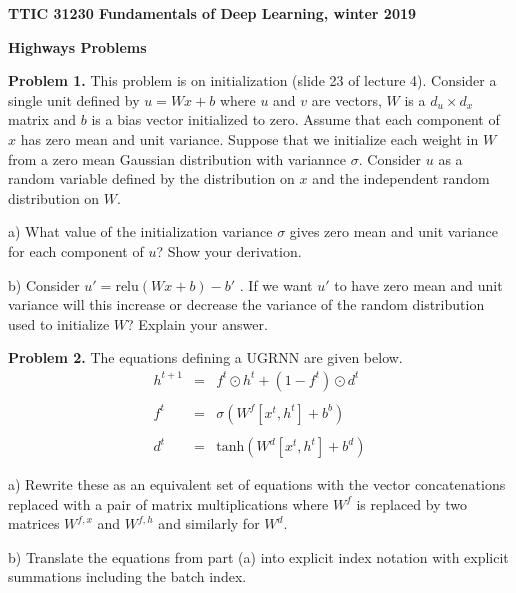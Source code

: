 \documentclass{article}
\newcommand{\solution}[1]{}
\begin{document}
\centerline{\bf TTIC 31230 Fundamentals of Deep Learning, winter 2019}

\bigskip
\centerline{\bf Highways Problems}


{\bf Problem 1.}  This problem is on initialization (slide 23 of lecture 4).  Consider a single unit defined by $u = Wx + b$ where $u$ and $v$ are vectors, $W$ is a $d_u \times d_x$ matrix and $b$ is a bias vector initialized to zero.  Assume that each component of $x$ has zero mean and unit variance.   Suppose that we initialize each weight in $W$ from a zero mean Gaussian distribution with variannce $\sigma$. Consider $u$ as a random variable defined by the distribution on $x$ and the independent random distribution on $W$.

a) What value of the initialization variance
$\sigma$ gives zero mean and unit variance for each component of $u$?  Show your derivation.

b) Consider $u' = \mathrm{relu}(Wx+ b) - b'$ .  If we want $u'$ to have zero mean and unit variance will this increase or decrease the variance of the random distribution used to initialize $W$?  Explain your answer.

\bigskip
{\bf Problem 2.} The equations defining a UGRNN are given below.
\begin{eqnarray*}
h^{t+1} & = & f^t\odot h^t + (1-f^t)\odot d^t \\
\\
f^t & = & \sigma(W^f[x^t,h^t] + b^b) \\
\\
d^t & = & \mathrm{tanh}(W^d[x^t,h^t] + b^d)
\end{eqnarray*}

a) Rewrite these as an equivalent set of equations with the vector concatenations replaced with a pair of matrix multiplications
where $W^f$ is replaced by two matrices $W^{f,x}$ and $W^{f,h}$ and similarly for $W^d$.

\solution{
$$h^{t+1} = f^t\odot h^t + (1-f^t)\odot d^t$$

$$f^t = \sigma(W^{f,x}x^t + W^{f,h}h^t + b^f)$$

$$d^t =  \mathrm{tanh}(W^{d,x}x^t + W^{d,h}h^t + b^d)$$

}

b) Translate the equations from part (a) into explicit index notation with explicit summations including the batch index.

\solution{
\begin{eqnarray*}
h^{t+1}[b,c] & =  & f^t[b,c]h^t[b,c] + (1-f^t[b,c])d^t[b,c] \\
\\
f^t[b,c] & = & \sigma\left(\left(\sum_{c'} W^{f,x}[c,c']x[b,c']\right) + \left(\sum_{c'} W^{f,h}[c,c']h^t[b,c']\right) + b^h[c]\right) \\
\\
d^t[b,c] & = & \sigma\left(\left(\sum_{c'} W^{d,x}[c,c']x[b,c']\right) + \left(\sum_{c'} W^{d,h}[c,c']h^t[b,c']\right) + b^d[c]\right)
\end{eqnarray*}
}
\end{document}
